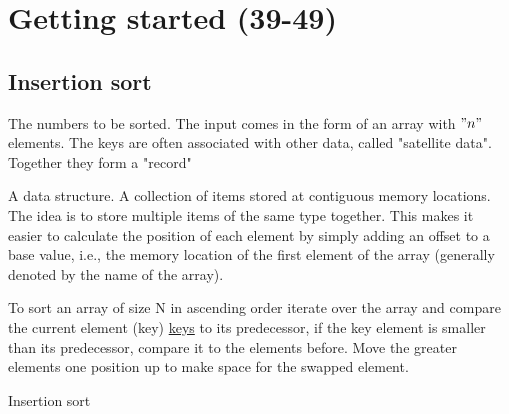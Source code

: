   \chapter{Getting started (39-49)}

  \section{Insertion sort}
  \begin{definition}[keys]\label{def:keys_1}
      The numbers to be sorted. The input comes in the form of an array with $"n"$ elements. The keys are often associated with other data, called "satellite data". Together they form a "record" 
  \end{definition}

  \begin{definition}[Arrays]\label{def:arrays_1}
      A data structure. A collection of items stored at contiguous memory locations. The idea is to store multiple items of the same type together. This makes it easier to calculate the position of each element by simply adding an offset to a base value, i.e., the memory location of the first element of the array (generally denoted by the name of the array).
  \end{definition}

\begin{eg}
To sort an array of size N in ascending order iterate over the array and compare the current element (key) \hyperref[def:keys_1]{keys} to its predecessor, if the key element is smaller than its predecessor, compare it to the elements before. Move the greater elements one position up to make space for the swapped element.
\end{eg}

\begin{algorithm}
\caption{Insertion sort}\label{alg:insertion_sort_1}
  \For{$i\gets2$ \KwTo $n$}{
  $key = A[1]$ \tcp*{Assign variable "key" to the index "i" of array "A"}
  
  $j = i - 1$ \tcp*{ Insert $A[1]$ into the sorted sub-array $A[1 : i -1]$}
  
  \tcc{Conditional check while true}
  \While{$j > 0$ and $A[j] > key$}{
  $A[j + 1] = A[j]$ \tcp*{Retrive value at index "j" and assign this value to the element at index $j + 1$}
  
  $j = j - 1$} \tcp*{Swap $j$ with the value at index $j - 1$}
  $A]j + 1] = key$
  }

\end{algorithm}



